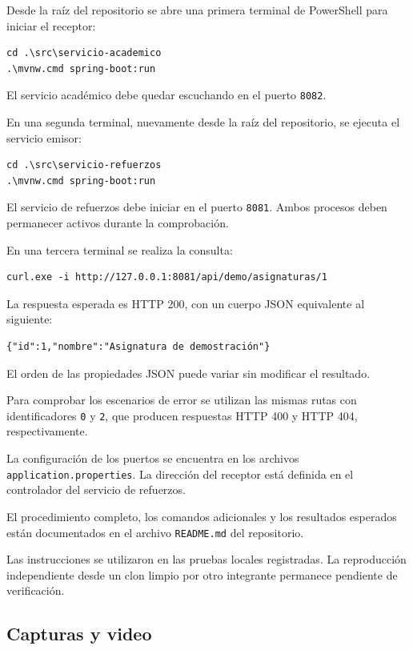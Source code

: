 Desde la raíz del repositorio se abre una primera terminal de PowerShell para iniciar el receptor:

\begin{verbatim}
cd .\src\servicio-academico
.\mvnw.cmd spring-boot:run
\end{verbatim}

El servicio académico debe quedar escuchando en el puerto \texttt{8082}.

En una segunda terminal, nuevamente desde la raíz del repositorio, se ejecuta el servicio emisor:

\begin{verbatim}
cd .\src\servicio-refuerzos
.\mvnw.cmd spring-boot:run
\end{verbatim}

El servicio de refuerzos debe iniciar en el puerto \texttt{8081}. Ambos procesos deben permanecer activos durante la comprobación.

En una tercera terminal se realiza la consulta:

\begin{verbatim}
curl.exe -i http://127.0.0.1:8081/api/demo/asignaturas/1
\end{verbatim}

La respuesta esperada es HTTP 200, con un cuerpo JSON equivalente al siguiente:

\begin{verbatim}
{"id":1,"nombre":"Asignatura de demostración"}
\end{verbatim}

El orden de las propiedades JSON puede variar sin modificar el resultado.

Para comprobar los escenarios de error se utilizan las mismas rutas con identificadores \texttt{0} y \texttt{2}, que producen respuestas HTTP 400 y HTTP 404, respectivamente.

La configuración de los puertos se encuentra en los archivos \texttt{application.properties}. La dirección del receptor está definida en el controlador del servicio de refuerzos.

El procedimiento completo, los comandos adicionales y los resultados esperados están documentados en el archivo \texttt{README.md} del repositorio.

Las instrucciones se utilizaron en las pruebas locales registradas. La reproducción independiente desde un clon limpio por otro integrante permanece pendiente de verificación.

\subsection{Capturas y video}

